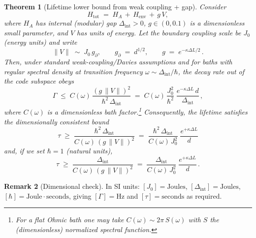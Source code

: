 \documentclass[11pt]{article}
\theoremstyle{plain}
\newtheorem{theorem}{Theorem}[section]
\theoremstyle{definition}
\newtheorem{remark}[theorem]{Remark}
\begin{document}
\begin{theorem}[Lifetime lower bound from weak coupling + gap]\label{thm:lifetime-derived}
  Consider
  \[
    H_{\mathrm{tot}} \;=\; H_A \,+\, H_{\mathrm{env}} \,+\, g\,V,
  \]
  where $H_A$ has internal (modular) gap $\Delta_{\mathrm{int}}>0$, $g\in(0,0.1)$ is a \emph{dimensionless} small parameter, and $V$ has units of energy. Let the boundary coupling scale be $J_0$ (energy units) and write
  \[
    \|V\| \;\sim\; J_0 \, g_{\partial},
    \qquad
    g_{\partial} \;=\; d^{1/2},
    \qquad
    g \;=\; e^{-\kappa \Delta L/2}\,.
  \]
  Then, under standard weak-coupling/Davies assumptions and for baths with regular spectral density at transition frequency $\omega\sim \Delta_{\mathrm{int}}/\hbar$, the decay rate out of the code subspace obeys
  \begin{equation}\label{eq:Gamma-bound-units}
    \Gamma \;\le\; C(\omega)\,\frac{(g\,\|V\|)^2}{\hbar^2\,\Delta_{\mathrm{int}}}
    \;=\; C(\omega)\,\frac{J_0^2}{\hbar^2}\;
    \frac{e^{-\kappa \Delta L}\, d}{\Delta_{\mathrm{int}}}\,,
  \end{equation}
  where $C(\omega)$ is a dimensionless bath factor.\footnote{For a flat Ohmic bath one may take $C(\omega)\sim 2\pi\,S(\omega)$ with $S$ the (dimensionless) normalized spectral function.}
  Consequently, the lifetime satisfies the \emph{dimensionally consistent} bound
  \begin{equation}\label{eq:lifetime-master-units}
    \boxed{\quad
      \tau \;\ge\; \frac{\hbar^2\,\Delta_{\mathrm{int}}}{C(\omega)\,(g\,\|V\|)^2}
      \;=\; \frac{\hbar^2\,\Delta_{\mathrm{int}}}{C(\omega)\,J_0^2}\;
      \frac{e^{+\kappa \Delta L}}{d}
    \quad}
  \end{equation}
  and, if we set $\hbar=1$ (natural units),
  \begin{equation}\label{eq:lifetime-master-hbar1}
    \boxed{\quad
      \tau \;\ge\; \frac{\Delta_{\mathrm{int}}}{C(\omega)\,(g\,\|V\|)^2}
      \;=\; \frac{\Delta_{\mathrm{int}}}{C(\omega)\,J_0^2}\;
      \frac{e^{+\kappa \Delta L}}{d}\,.
    \quad}
  \end{equation}
\end{theorem}

\begin{remark}[Dimensional check]
  In SI units: $[J_0] = \text{Joules}$, $[\Delta_{\mathrm{int}}] = \text{Joules}$,
  $[\hbar] = \text{Joule}\cdot\text{seconds}$, giving $[\Gamma] = \text{Hz}$
  and $[\tau] = \text{seconds}$ as required.
\end{remark}
\end{document}
